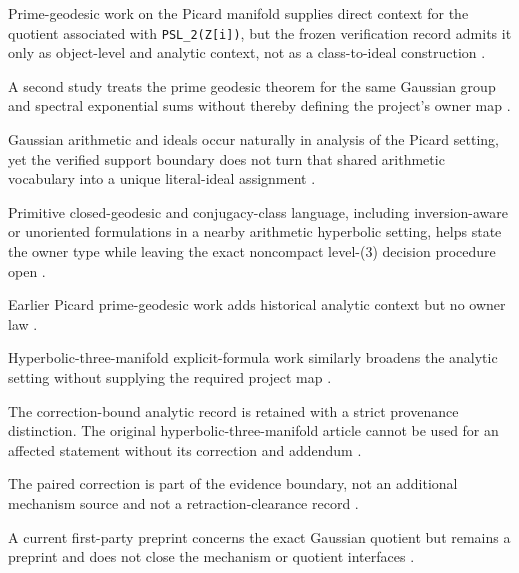 \documentclass[11pt,a4paper]{article}
\begin{document}
Prime-geodesic work on the Picard manifold supplies direct context for the quotient associated with \texttt{PSL\_2(Z{[}i{]})}, but the frozen verification record admits it only as object-level and analytic context, not as a class-to-ideal construction
\citep{P29-S01}.

A second study treats the prime geodesic theorem for the same Gaussian group and spectral exponential sums without thereby defining the project's owner map
\citep{P29-S02}.

Gaussian arithmetic and ideals occur naturally in analysis of the Picard setting, yet the verified support boundary does not turn that shared arithmetic vocabulary into a unique literal-ideal assignment
\citep{P29-S03}.

Primitive closed-geodesic and conjugacy-class language, including inversion-aware or unoriented formulations in a nearby arithmetic hyperbolic setting, helps state the owner type while leaving the exact noncompact level-(3) decision procedure open
\citep{P29-S08}.

Earlier Picard prime-geodesic work adds historical analytic context but no owner law
\citep{P29-S04}.

Hyperbolic-three-manifold explicit-formula work similarly broadens the analytic setting without supplying the required project map
\citep{P29-S05}.

The correction-bound analytic record is retained with a strict provenance distinction. The original hyperbolic-three-manifold article cannot be used for an affected statement without its correction and addendum
\citep{P29-S06}.

The paired correction is part of the evidence boundary, not an additional mechanism source and not a retraction-clearance record
\citep{P29-S07}.

A current first-party preprint concerns the exact Gaussian quotient but remains a preprint and does not close the mechanism or quotient interfaces
\citep{P29-S09}.
\end{document}
